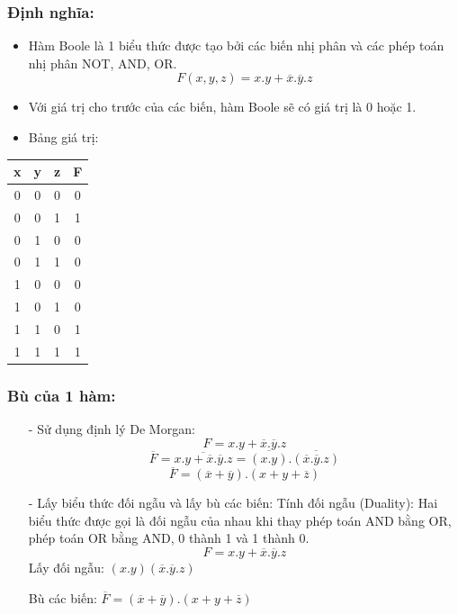 \subsubsection{Định nghĩa:}
\begin{itemize}
    \item Hàm Boole là 1 biểu thức được tạo bởi các biến nhị phân và các phép toán nhị phân NOT, AND, OR.
        \[
            F(x,y,z)=x.y+\overline{x}.\overline{y}.z
        \]
    \item Với giá trị cho trước của các biến, hàm Boole sẽ có giá trị là 0 hoặc 1.
    \item Bảng giá trị:
\end{itemize}
\begin{table}[h!]
    \centering
    \begin{tabular}{|ccc|c|}
    \hline
    \textbf{x} & \textbf{y} & \textbf{z} & \textbf{F} \\ \hline
    0          & 0          & 0          & 0          \\ 
    0          & 0          & 1          & 1          \\ 
    0          & 1          & 0          & 0          \\ 
    0          & 1          & 1          & 0          \\ 
    1          & 0          & 0          & 0          \\ 
    1          & 0          & 1          & 0          \\ 
    1          & 1          & 0          & 1          \\ 
    1          & 1          & 1          & 1          \\ \hline
    \end{tabular}
    \end{table}
\subsubsection{Bù của 1 hàm:}
\begin{itemize}
    \item[-] Sử dụng định lý De Morgan:
        \[
            F = x.y+\overline{x}.\overline{y}.z
        \]
        \[
            \overline{F} = \overline{x.y+\overline{x}.\overline{y}.z} = \overline{(x.y)}.\overline{(\overline{x}.\overline{y}.z)}
        \]
        \[
            \overline{F} = (\overline{x} + \overline{y}).(x+y+\overline{z})
        \]
    \item[-] Lấy biểu thức đối ngẫu và lấy bù các biến: Tính đối ngẫu (Duality): Hai biểu thức được gọi là đối ngẫu của nhau khi thay phép toán AND bằng OR, phép toán OR bằng AND, 0 thành 1 và 1 thành 0.
        \[
            F = x.y+\overline{x}.\overline{y}.z
        \]
    Lấy đối ngẫu: $(x.y)(\overline{x}.\overline{y}.z)$

    Bù các biến: $\overline{F} = (\overline{x} + \overline{y}).(x+y+\overline{z})$
\end{itemize}
